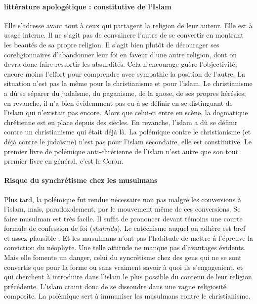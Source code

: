 \paragraph{littérature apologétique : constitutive de l'Islam}
Elle s'adresse avant tout à ceux qui partagent la religion de leur auteur. Elle est à usage interne. Il ne s'agit pas de convaincre l'autre de se convertir en montrant les beautés de sa propre religion. Il s'agit bien plutôt de décourager ses coreligionnaires d'abandonner leur foi en faveur d'une autre religion, dont on devra donc faire ressortir les absurdités. Cela n'encourage guère l'objectivité, encore moins l'effort pour comprendre avec sympathie la position de l'autre.
La situation n'est pas la même pour le christianisme et pour l'islam. Le christianisme a dû se séparer du judaïsme, du paganisme,
de la gnose, de ses propres hérésies; en revanche, il n'a bien évidemment pas eu à se définir en se distinguant de l'islam qui n'existait pas encore. Alors que celui-ci entre en scène, la dogmatique chrétienne est en place depuis des siècles. En revanche, l'islam a dû se définir contre un christianisme qui était déjà là. La polémique contre le christianisme (et déjà contre le judaïsme) n'est pas pour l'islam secondaire, elle est constitutive. Le premier livre de polémique anti-chrétienne de l'islam n'est autre que son tout premier livre en général, c'est le Coran.

\paragraph{Risque du synchrétisme chez les musulmans}
Plus tard, la polémique fut rendue nécessaire non pas malgré les conversions à l'islam, mais, paradoxalement, par le mouvement même de ces conversions. Se faire musulman est très facile. Il suffit de prononcer devant témoins une courte formule de confession de foi (\textit{shahiida}). Le catéchisme auquel on adhère est bref et assez plausible . Et les musulmans n'ont pas l'habitude de mettre à l'épreuve la conviction du néophyte. Une telle attitude ne manque pas d'avantages évidents. Mais elle fomente un danger, celui du syncrétisme chez des gens qui ne se sont convertis que pour la forme ou sans vraiment savoir à quoi ils s'engageaient, et qui cherchent à introduire dans l'islam le plus possible du contenu de leur religion précédente. L'islam craint donc de se dissoudre dans une vague religiosité composite. La polémique sert à immuniser les musulmans contre le christianisme.
